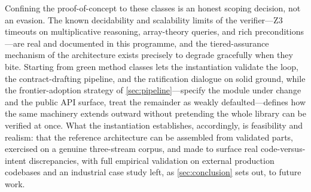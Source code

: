 Confining the proof-of-concept to these classes is an honest scoping decision, not an evasion. The known decidability and scalability limits of the verifier---Z3 timeouts on multiplicative reasoning, array-theory queries, and rich preconditions---are real and documented in this programme, and the tiered-assurance mechanism of the architecture exists precisely to degrade gracefully when they bite. Starting from green method classes lets the instantiation validate the loop, the contract-drafting pipeline, and the ratification dialogue on solid ground, while the frontier-adoption strategy of \cref{sec:pipeline}---specify the module under change and the public API surface, treat the remainder as weakly defaulted---defines how the same machinery extends outward without pretending the whole library can be verified at once. What the instantiation establishes, accordingly, is feasibility and realism: that the reference architecture can be assembled from validated parts, exercised on a genuine three-stream corpus, and made to surface real code-versus-intent discrepancies, with full empirical validation on external production codebases and an industrial case study left, as \cref{sec:conclusion} sets out, to future work.
